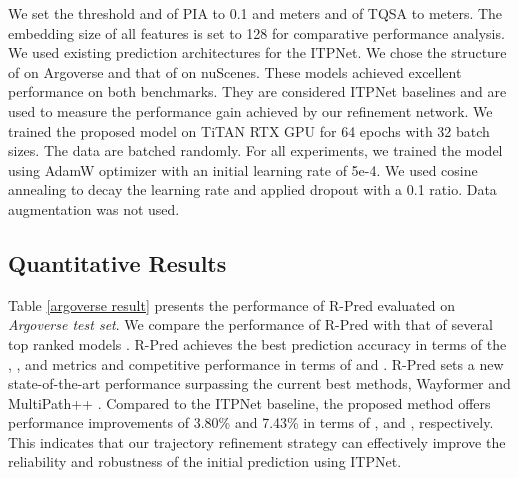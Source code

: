 \documentclass[10pt,twocolumn,letterpaper]{article}
\begin{document}
 We set the threshold  and  of PIA to 0.1 and  meters and  of TQSA to  meters. The embedding size of all features is set to 128 for comparative performance analysis.  
We used existing prediction architectures for the ITPNet. We chose the structure of \cite{HiVT} on Argoverse and that of \cite{PGP} on nuScenes. These models achieved excellent performance on both benchmarks. They are considered ITPNet baselines and are used to measure the performance gain achieved by our refinement network. 
 We trained the proposed model on TiTAN RTX GPU for 64 epochs with 32 batch sizes. The data are batched randomly. For all experiments, we trained the model using AdamW optimizer with an initial learning rate of 5e-4. We used cosine annealing to decay the learning rate and applied dropout with a 0.1 ratio. Data augmentation was not used. 

\begin{table} [ht]
    \centering {}
    \vspace{2.0pt}
    \caption{Ablation study. Contributions of the main components evaluated on the \textit{Argoverse validation set}.}
        \label{ablation} 
\end{table}
\vspace{-5.0pt}

\subsection{Quantitative Results}

Table \ref{argoverse result} presents the performance of R-Pred evaluated on {\it Argoverse test set}. We compare the performance of R-Pred with that of several top ranked models \cite{LaneRCNN,TNT,PRIME,LaneGCN,home,mmTransformer,DenseTNT,THOMAS,Scenetransformer,LTP,gohome,TPCN,multipath++,Wayformer, HiVT}. R-Pred achieves the best prediction accuracy in terms of the , ,  and  metrics and competitive performance in terms of  and .  R-Pred sets a new state-of-the-art performance surpassing the current best methods, Wayformer \cite{Wayformer} and MultiPath++ \cite{multipath++}.  Compared to the ITPNet baseline, the proposed method offers performance improvements of 3.80\% and 7.43\% in terms of , and , respectively. This indicates that our trajectory refinement strategy can effectively improve the reliability and robustness of the initial prediction using ITPNet.
\end{document}
